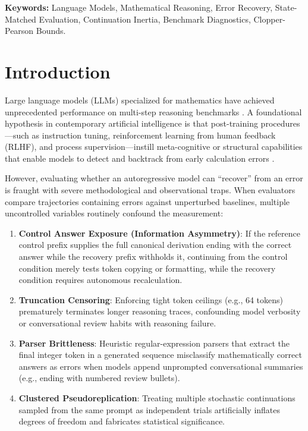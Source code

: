 \documentclass[11pt,letterpaper]{article}
\begin{document}
\vspace{0.5em}
\noindent\textbf{Keywords:} Language Models, Mathematical Reasoning, Error Recovery, State-Matched Evaluation, Continuation Inertia, Benchmark Diagnostics, Clopper-Pearson Bounds.

\newpage

\section{Introduction}

Large language models (LLMs) specialized for mathematics have achieved unprecedented performance on multi-step reasoning benchmarks \cite{cobbe2021gsm8k, qwen25math2024}. A foundational hypothesis in contemporary artificial intelligence is that post-training procedures—such as instruction tuning, reinforcement learning from human feedback (RLHF), and process supervision—instill meta-cognitive or structural capabilities that enable models to detect and backtrack from early calculation errors \cite{lightman2023process, zelikman2022star, snell2024scaling}.

However, evaluating whether an autoregressive model can ``recover'' from an error is fraught with severe methodological and observational traps. When evaluators compare trajectories containing errors against unperturbed baselines, multiple uncontrolled variables routinely confound the measurement:
\begin{enumerate}[leftmargin=*]
    \item \textbf{Control Answer Exposure (Information Asymmetry)}: If the reference control prefix supplies the full canonical derivation ending with the correct answer while the recovery prefix withholds it, continuing from the control condition merely tests token copying or formatting, while the recovery condition requires autonomous recalculation.
    \item \textbf{Truncation Censoring}: Enforcing tight token ceilings (e.g., 64 tokens) prematurely terminates longer reasoning traces, confounding model verbosity or conversational review habits with reasoning failure.
    \item \textbf{Parser Brittleness}: Heuristic regular-expression parsers that extract the final integer token in a generated sequence misclassify mathematically correct answers as errors when models append unprompted conversational summaries (e.g., ending with numbered review bullets).
    \item \textbf{Clustered Pseudoreplication}: Treating multiple stochastic continuations sampled from the same prompt as independent trials artificially inflates degrees of freedom and fabricates statistical significance.
\end{enumerate}
\end{document}
